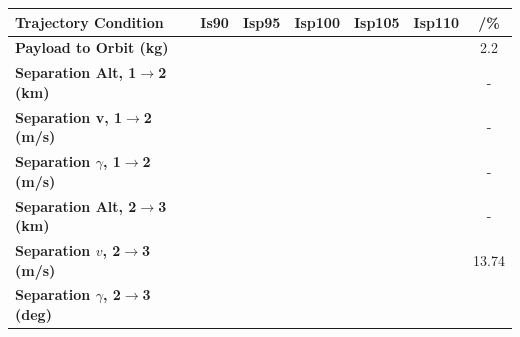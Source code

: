 \begin{table}[ht!]
	\centering
\begin{tabular}{l c c c c c c} 
	\hline \textbf{Trajectory Condition}
	&Is90
	&Isp95
	&Isp100
	&Isp105
	&Isp110
	& /\%
	\\
	\hline \textbf{Payload to Orbit (kg)}
	& \PayloadToOrbitIspNinetyNoReturn
	& \PayloadToOrbitIspNinetyFiveNoReturn
	& \PayloadToOrbitIspStandardNoReturn
	& \PayloadToOrbitIspOneHundredFiveNoReturn
	& \PayloadToOrbitIspOneHundredTenNoReturn
	&2.2
	\\
	\textbf{Separation Alt, 1$\rightarrow$2 (km)}
	& \firstsecondSeparationAltIspNinetyNoReturn
	& \firstsecondSeparationAltIspNinetyFiveNoReturn
	& \firstsecondSeparationAltIspStandardNoReturn
	& \firstsecondSeparationAltIspOneHundredFiveNoReturn
	& \firstsecondSeparationAltIspOneHundredTenNoReturn
	& -
	\\
	\textbf{Separation v, 1$\rightarrow$2 (m/s)}
	& \firstsecondSeparationvIspNinetyNoReturn
	& \firstsecondSeparationvIspNinetyFiveNoReturn
	& \firstsecondSeparationvIspStandardNoReturn
	& \firstsecondSeparationvIspOneHundredFiveNoReturn
	& \firstsecondSeparationvIspOneHundredTenNoReturn
	& -
	\\
	\textbf{Separation $\gamma$, 1$\rightarrow$2 (m/s)}
	& \firstsecondSeparationgammaIspNinetyNoReturn
	& \firstsecondSeparationgammaIspNinetyFiveNoReturn
	& \firstsecondSeparationgammaIspStandardNoReturn
	& \firstsecondSeparationgammaIspOneHundredFiveNoReturn
	& \firstsecondSeparationgammaIspOneHundredTenNoReturn
	& -
	\\
	\textbf{Separation Alt, 2$\rightarrow$3 (km)}
	& \secondthirdSeparationAltIspNinetyNoReturn
	& \secondthirdSeparationAltIspNinetyFiveNoReturn
	& \secondthirdSeparationAltIspStandardNoReturn
	& \secondthirdSeparationAltIspOneHundredFiveNoReturn
	& \secondthirdSeparationAltIspOneHundredTenNoReturn
	& -
	\\
	\textbf{Separation $v$, 2$\rightarrow$3 (m/s)}
	& \secondthirdSeparationvIspNinetyNoReturn
	& \secondthirdSeparationvIspNinetyFiveNoReturn
	& \secondthirdSeparationvIspStandardNoReturn
	& \secondthirdSeparationvIspOneHundredFiveNoReturn
	& \secondthirdSeparationvIspOneHundredTenNoReturn
	&13.74
	\\
	\textbf{Separation $\gamma$, 2$\rightarrow$3 (deg)}
	& \secondthirdSeparationgammaIspNinetyNoReturn
	& \secondthirdSeparationgammaIspNinetyFiveNoReturn
	& \secondthirdSeparationgammaIspStandardNoReturn
	& \secondthirdSeparationgammaIspOneHundredFiveNoReturn
	& \secondthirdSeparationgammaIspOneHundredTenNoReturn

\end{tabular}
\end{table}
